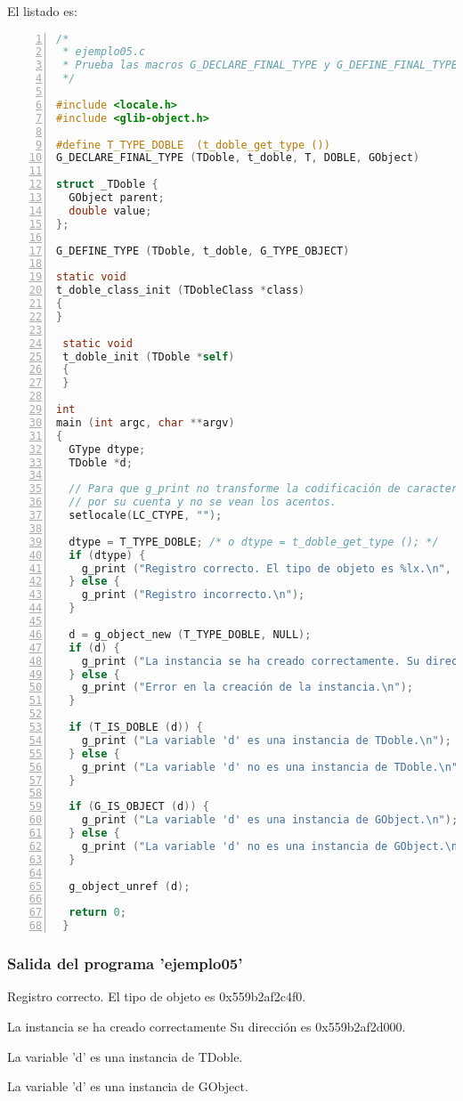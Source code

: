 El listado es:
\begin{lstlisting}[language=C, numbers=left]
/*
 * ejemplo05.c
 * Prueba las macros G_DECLARE_FINAL_TYPE y G_DEFINE_FINAL_TYPE
 */

#include <locale.h>
#include <glib-object.h>
 
#define T_TYPE_DOBLE  (t_doble_get_type ())
G_DECLARE_FINAL_TYPE (TDoble, t_doble, T, DOBLE, GObject)
 
struct _TDoble {
  GObject parent;
  double value;
};
 
G_DEFINE_TYPE (TDoble, t_doble, G_TYPE_OBJECT)
 
static void
t_doble_class_init (TDobleClass *class)
{
}
 
 static void
 t_doble_init (TDoble *self)
 {
 }
 
int
main (int argc, char **argv)
{
  GType dtype;
  TDoble *d;

  // Para que g_print no transforme la codificación de caracteres
  // por su cuenta y no se vean los acentos.
  setlocale(LC_CTYPE, "");
  
  dtype = T_TYPE_DOBLE; /* o dtype = t_doble_get_type (); */
  if (dtype) {
    g_print ("Registro correcto. El tipo de objeto es %lx.\n", dtype);
  } else {
    g_print ("Registro incorrecto.\n");
  }
 
  d = g_object_new (T_TYPE_DOBLE, NULL);
  if (d) {
    g_print ("La instancia se ha creado correctamente. Su dirección es %p.\n", d);
  } else {
    g_print ("Error en la creación de la instancia.\n");
  }
 
  if (T_IS_DOBLE (d)) {
    g_print ("La variable 'd' es una instancia de TDoble.\n");
  } else {
    g_print ("La variable 'd' no es una instancia de TDoble.\n");
  }
 
  if (G_IS_OBJECT (d)) {
    g_print ("La variable 'd' es una instancia de GObject.\n");
  } else {
    g_print ("La variable 'd' no es una instancia de GObject.\n");
  }
  
  g_object_unref (d);
 
  return 0;
 }
\end{lstlisting}

 \subsubsection{Salida del programa 'ejemplo05'}
\textsf{Registro correcto. El tipo de objeto es 0x559b2af2c4f0.}\par
\textsf{La instancia se ha creado correctamente Su dirección es 0x559b2af2d000.}\par
\textsf{La variable 'd' es una instancia de TDoble.}\par
\textsf{La variable 'd' es una instancia de GObject.}\par

